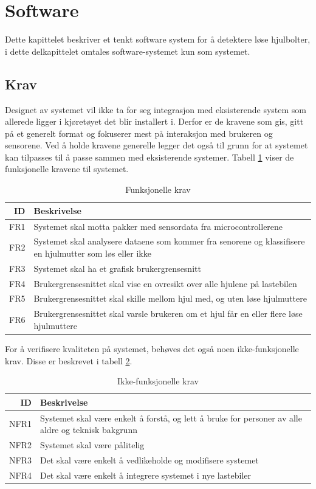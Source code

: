 \section{Software}
Dette kapittelet beskriver et tenkt software system for å detektere løse hjulbolter, i dette delkapittelet omtales software-systemet kun som systemet.

\subsection{Krav}
Designet av systemet vil ikke ta for seg integrasjon med eksisterende system som allerede ligger i kjøretøyet det blir installert i. Derfor er de kravene som gis, gitt på et generelt format og fokuserer mest på interaksjon med brukeren og sensorene. Ved å holde kravene generelle legger det også til grunn for at systemet kan tilpasses til å passe sammen med eksisterende systemer. Tabell \ref{tab:frequirements} viser de funksjonelle kravene til systemet.
\begin{table}[H]
\caption{Funksjonelle krav}
\label{tab:frequirements}
\begin{tabularx}{\textwidth}{r|X}
ID & Beskrivelse \\ 
\hline
FR1 & Systemet skal motta pakker med sensordata fra microcontrollerene \\
FR2 & Systemet skal analysere dataene som kommer fra senorene og klassifisere en hjulmutter som løs eller ikke \\
FR3 & Systemet skal ha et grafisk brukergrensesnitt \\
FR4 & Brukergrensesnittet skal vise en ovresikt over alle hjulene på lastebilen \\
FR5 & Brukergrensesnittet skal skille mellom hjul med, og uten løse hjulmuttere \\
FR6 & Brukergrensesnittet skal varsle brukeren om et hjul får en eller flere løse hjulmuttere \\
\hline
\end{tabularx}
\end{table}

For å verifisere kvaliteten på systemet, behøves det også noen ikke-funksjonelle krav. Disse er beskrevet i tabell \ref{tab:nfrequirements}.
\begin{table}[H]
\caption{Ikke-funksjonelle krav}
\label{tab:nfrequirements}
\begin{tabularx}{\textwidth}{r|X}
ID & Beskrivelse \\ 
\hline
NFR1 & Systemet skal være enkelt å forstå, og lett å bruke for personer av alle aldre og teknisk bakgrunn \\
NFR2 & Systemet skal være pålitelig \\
NFR3 & Det skal være enkelt å vedlikeholde og modifisere systemet \\
NFR4 & Det skal være enkelt å integrere systemet i nye lastebiler\\
\hline
\end{tabularx}
\end{table}

